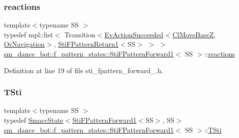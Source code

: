 \subsubsection{\texorpdfstring{reactions}{reactions}}
{\footnotesize\ttfamily template$<$typename SS $>$ \\
typedef mpl\+::list$<$ Transition$<$\hyperlink{structsmacc_1_1default__events_1_1EvActionSucceeded}{Ev\+Action\+Succeeded}$<$\hyperlink{classcl__move__base__z_1_1ClMoveBaseZ}{Cl\+Move\+BaseZ}, \hyperlink{classsm__dance__bot_1_1OrNavigation}{Or\+Navigation}$>$, \hyperlink{structsm__dance__bot_1_1f__pattern__states_1_1StiFPatternReturn1}{Sti\+F\+Pattern\+Return1}$<$SS$>$ $>$ $>$ \hyperlink{structsm__dance__bot_1_1f__pattern__states_1_1StiFPatternForward1}{sm\+\_\+dance\+\_\+bot\+::f\+\_\+pattern\+\_\+states\+::\+Sti\+F\+Pattern\+Forward1}$<$ SS $>$\+::\hyperlink{structsm__dance__bot_1_1f__pattern__states_1_1StiFPatternForward1_a17e681abc29409eb4d79ac3d75e91ddf}{reactions}}



Definition at line 19 of file sti\+\_\+fpattern\+\_\+forward\+\_.\+h.

\mbox{\label{structsm__dance__bot_1_1f__pattern__states_1_1StiFPatternForward1_a7dff4a86e12407b2daf0d34aba22d21b}} 
\subsubsection{\texorpdfstring{T\+Sti}{TSti}}
{\footnotesize\ttfamily template$<$typename SS $>$ \\
typedef \hyperlink{classSmaccState}{Smacc\+State}$<$\hyperlink{structsm__dance__bot_1_1f__pattern__states_1_1StiFPatternForward1}{Sti\+F\+Pattern\+Forward1}$<$SS$>$, SS$>$ \hyperlink{structsm__dance__bot_1_1f__pattern__states_1_1StiFPatternForward1}{sm\+\_\+dance\+\_\+bot\+::f\+\_\+pattern\+\_\+states\+::\+Sti\+F\+Pattern\+Forward1}$<$ SS $>$\+::\hyperlink{structsm__dance__bot_1_1f__pattern__states_1_1StiFPatternForward1_a7dff4a86e12407b2daf0d34aba22d21b}{T\+Sti}}



